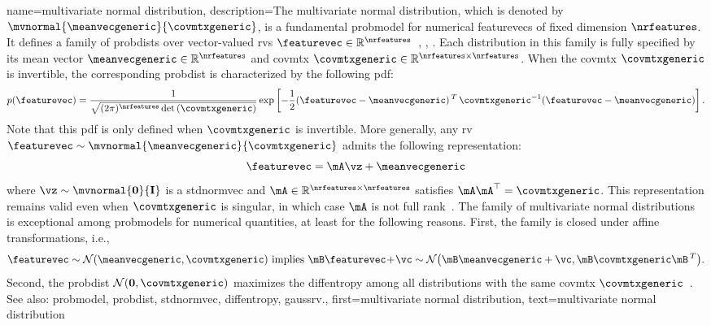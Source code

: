 	
{name={multivariate normal distribution}, 
	description={The multivariate normal distribution, 
		which is denoted by $\mvnormal{\meanvecgeneric}{\covmtxgeneric}$, is a fundamental 
		\gls{probmodel} for numerical \glspl{featurevec} of fixed dimension $\nrfeatures$. 
		It defines a family of \glspl{probdist} over \gls{vector}-valued \glspl{rv} 
		$\featurevec \in \mathbb{R}^{\nrfeatures}$~\cite{BertsekasProb}, \cite{GrayProbBook}, \cite{Lapidoth09}. 
		Each distribution in this family is fully specified by its \gls{mean} \gls{vector} 
		$\meanvecgeneric \in \mathbb{R}^{\nrfeatures}$ and \gls{covmtx} 
		$\covmtxgeneric \in \mathbb{R}^{\nrfeatures \times \nrfeatures}$. When the 
		\gls{covmtx} $\covmtxgeneric$ is invertible, the corresponding \gls{probdist} is 
		characterized by the following \gls{pdf}:
		\[p(\featurevec) = 
 		\frac{1}{\sqrt{(2\pi)^{\nrfeatures} \det\,(\covmtxgeneric)}} 
 		\exp\left[ -\frac{1}{2} 
 		(\featurevec - \meanvecgeneric)\,^{T}\, \covmtxgeneric^{-1} 
 		(\featurevec - \meanvecgeneric) \right].
 		\]
		Note that this \gls{pdf} is only defined when $\covmtxgeneric$ is invertible.
   		More generally, any \gls{rv} $\featurevec \sim \mvnormal{\meanvecgeneric}{\covmtxgeneric}$ 
   		admits the following representation:
  		\[
    		\featurevec = \mA \vz + \meanvecgeneric
   		\]
   		where $\vz \sim \mvnormal{\mathbf{0}}{\mathbf{I}}$ is a \gls{stdnormvec} 
   		and $\mA \in \mathbb{R}^{\nrfeatures \times \nrfeatures}$ satisfies $\mA \mA^\top = \covmtxgeneric$. 
   		This representation remains valid even when $\covmtxgeneric$ is singular, in which case $\mA$ 
   		is not full rank~\cite[Ch. 23]{Lapidoth2017}.
   		The family of multivariate normal distributions is exceptional among \glspl{probmodel} for numerical 
   		quantities, at least for the following reasons. First, the family is closed under affine 
   		transformations, i.e.,
		\[ 
		\featurevec \sim \mathcal{N}(\meanvecgeneric,\covmtxgeneric) \mbox{ implies } 
		\mB\featurevec\!+\!\vc \sim \mathcal{N}\big( \mB\meanvecgeneric+\vc,\mB \covmtxgeneric \mB\,^{T} \big). 
		\]
		Second, the \gls{probdist} $\mathcal{N}(\mathbf{0},\covmtxgeneric)$ maximizes the 
		\gls{diffentropy} among all distributions with the same \gls{covmtx} $\covmtxgeneric$~\cite{coverthomas}. 
		\\ 
		See also: \gls{probmodel}, \gls{probdist}, \gls{stdnormvec}, \gls{diffentropy}, \gls{gaussrv}.}, 
	first={multivariate normal distribution},
	text={multivariate normal distribution}
}

